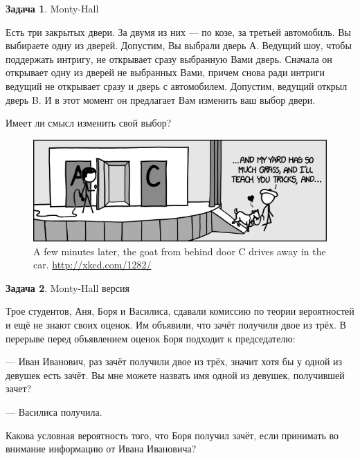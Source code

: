 \documentclass[nobib]{tufte-handout}
\theoremstyle{definition}
\newtheorem{problem}{Задача}
\begin{document}
\begin{problem}
Monty-Hall

Есть три закрытых двери. За двумя из них — по козе, за третьей автомобиль. Вы выбираете одну из дверей. Допустим, Вы выбрали дверь А. Ведущий шоу, чтобы поддержать интригу, не открывает сразу выбранную Вами дверь. Сначала он открывает одну из дверей не выбранных Вами, причем снова ради интриги ведущий не открывает сразу и дверь с автомобилем. Допустим, ведущий открыл дверь B. И в этот момент он предлагает Вам изменить ваш выбор двери.

Имеет ли смысл изменить свой выбор?

\begin{figure}
  \includegraphics[width=17cm]{images/monty_hall}
  \caption{A few minutes later, the goat from behind door C drives away in the car. \url{http://xkcd.com/1282/}}
\end{figure}


\end{problem}


\begin{problem}
Monty-Hall версия

Трое студентов, Аня, Боря и Василиса, сдавали комиссию по теории вероятностей и ещё не знают своих оценок. Им объявили, что зачёт получили двое из трёх. В перерыве перед объявлением оценок Боря подходит к председателю:

— Иван Иванович, раз зачёт получили двое из трёх, значит хотя бы у одной из девушек есть зачёт. Вы мне можете назвать имя одной из девушек, получившей зачет?

— Василиса получила.

Какова условная вероятность того, что Боря получил зачёт, если принимать во внимание информацию от Ивана Ивановича?

\end{problem}
\end{document}
